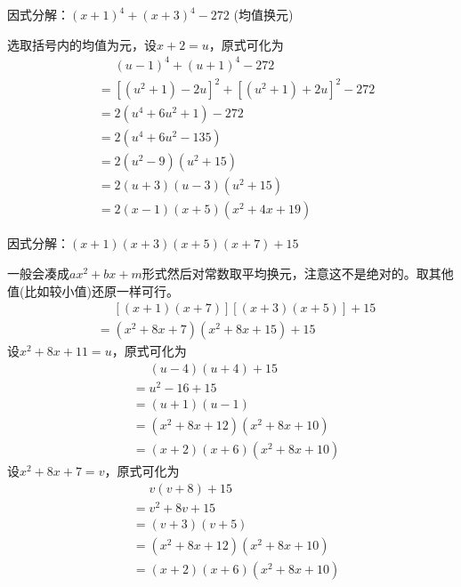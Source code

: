 \documentclass[windows,csize4,answers]{BHCexam}
\begin{document}
\begin{groups}
\begin{questions}[]
        \question[5] 因式分解：$(x+1)^4+(x+3)^4-272$ (均值换元)
        \begin{solution}{0.5cm}
            \methodonly 选取括号内的均值为元，设$x+2=u$，原式可化为
            \[
                \begin{aligned}
                     & \phantom{=}(u-1)^4+(u+1)^4-272        \\
                     & = [(u^2+1)-2u]^2 + [(u^2+1)+2u]^2-272 \\
                     & = 2(u^4+6u^2+1)-272                   \\
                     & = 2(u^4+6u^2-135)                     \\
                     & = 2(u^2-9)(u^2+15)                    \\
                     & = 2(u+3)(u-3)(u^2+15)                 \\
                     & = 2(x-1)(x+5)(x^2+4x+19)
                \end{aligned}
            \]
        \end{solution}
        \vspace{3.5cm}

        \question[5] 因式分解：$(x+1)(x+3)(x+5)(x+7)+15$
        \begin{solution}{0.5cm}
            \method 一般会凑成$ax^2+bx+m$形式然后对常数取平均换元，注意这不是绝对的。取其他值(比如较小值)还原一样可行。
            \[
                \begin{aligned}
                     & \phantom{=}[(x+1)(x+7)][(x+3)(x+5)]+15 \\
                     & = (x^2+8x+7)(x^2+8x+15) +15
                \end{aligned}
            \]
            设$x^2+8x+11=u$，原式可化为
            \[
                \begin{aligned}
                     & \phantom{=}(u-4)(u+4)+15 \\
                     & =  u^2-16+15             \\
                     & = (u+1)(u-1)             \\
                     & = (x^2+8x+12)(x^2+8x+10) \\
                     & = (x+2)(x+6)(x^2+8x+10)
                \end{aligned}
            \]
            \method 设$x^2+8x+7=v$，原式可化为
            \[
                \begin{aligned}
                     & \phantom{=}v(v+8)+15     \\
                     & =  v^2+8v+15             \\
                     & = (v+3)(v+5)             \\
                     & = (x^2+8x+12)(x^2+8x+10) \\
                     & = (x+2)(x+6)(x^2+8x+10)
                \end{aligned}
            \]
        \end{solution}
        \vspace{3.5cm}


\end{questions}
\end{groups}
\end{document}
